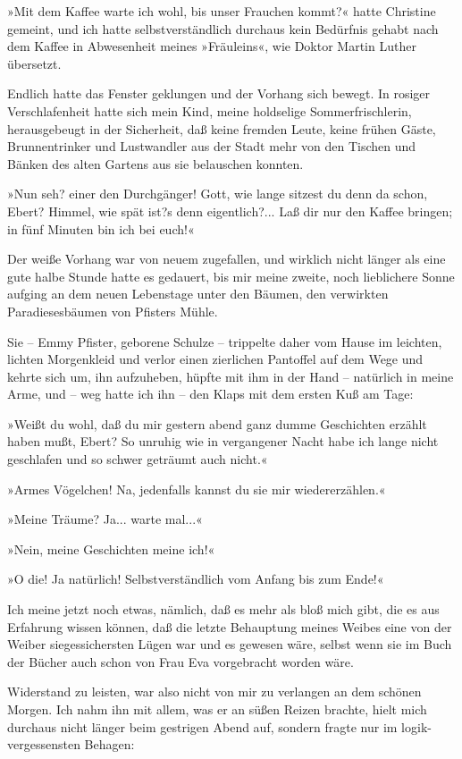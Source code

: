 »Mit dem Kaffee warte ich wohl, bis unser Frauchen kommt?« hatte
Christine gemeint, und ich hatte selbstverständlich durchaus kein
Bedürfnis gehabt nach dem Kaffee in Abwesenheit meines »Fräuleins«,
wie Doktor Martin Luther übersetzt.

Endlich hatte das Fenster geklungen und der Vorhang sich bewegt. In
rosiger Verschlafenheit hatte sich mein Kind, meine holdselige
Sommerfrischlerin, herausgebeugt in der Sicherheit, daß keine
fremden Leute, keine frühen Gäste, Brunnentrinker und Lustwandler
aus der Stadt mehr von den Tischen und Bänken des alten Gartens aus
sie belauschen konnten.

»Nun seh? einer den Durchgänger! Gott, wie lange sitzest du denn da
schon, Ebert? Himmel, wie spät ist?s denn eigentlich?... Laß dir
nur den Kaffee bringen; in fünf Minuten bin ich bei euch!«

Der weiße Vorhang war von neuem zugefallen, und wirklich nicht
länger als eine gute halbe Stunde hatte es gedauert, bis mir meine
zweite, noch lieblichere Sonne aufging an dem neuen Lebenstage
unter den Bäumen, den verwirkten Paradiesesbäumen von Pfisters
Mühle.

Sie – Emmy Pfister, geborene Schulze – trippelte daher vom Hause im
leichten, lichten Morgenkleid und verlor einen zierlichen Pantoffel
auf dem Wege und kehrte sich um, ihn aufzuheben, hüpfte mit ihm in
der Hand – natürlich in meine Arme, und – weg hatte ich ihn – den
Klaps mit dem ersten Kuß am Tage:

»Weißt du wohl, daß du mir gestern abend ganz dumme Geschichten
erzählt haben mußt, Ebert? So unruhig wie in vergangener Nacht habe
ich lange nicht geschlafen und so schwer geträumt auch nicht.«

»Armes Vögelchen! Na, jedenfalls kannst du sie mir
wiedererzählen.«

»Meine Träume? Ja... warte mal...«

»Nein, meine Geschichten meine ich!«

»O die! Ja natürlich! Selbstverständlich vom Anfang bis zum Ende!«

Ich meine jetzt noch etwas, nämlich, daß es mehr als bloß mich
gibt, die es aus Erfahrung wissen können, daß die letzte Behauptung
meines Weibes eine von der Weiber siegessichersten Lügen war und es
gewesen wäre, selbst wenn sie im Buch der Bücher auch schon von
Frau Eva vorgebracht worden wäre.

Widerstand zu leisten, war also nicht von mir zu verlangen an dem
schönen Morgen. Ich nahm ihn mit allem, was er an süßen Reizen
brachte, hielt mich durchaus nicht länger beim gestrigen Abend auf,
sondern fragte nur im logik-vergessensten Behagen:

